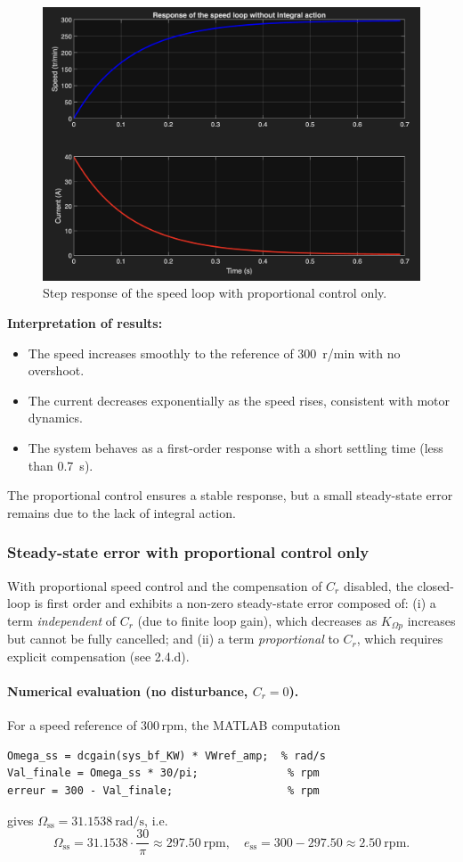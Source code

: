 \documentclass{rapportCS}
\begin{document}
\begin{figure}[H]
    \centering
    \includegraphics[width=0.85\linewidth]{figures/speedloop.png}
    \caption{Step response of the speed loop with proportional control only.}
    \label{fig:speedloop_no_integral}
\end{figure}

\noindent\textbf{Interpretation of results:}
\begin{itemize}
    \item The speed increases smoothly to the reference of 300~r/min with no overshoot.
    \item The current decreases exponentially as the speed rises, consistent with motor dynamics.
    \item The system behaves as a first-order response with a short settling time (less than 0.7~s).
\end{itemize}

The proportional control ensures a stable response, but a small steady-state error remains due to the lack of integral action.
\subsubsection{Steady-state error with proportional control only}

With proportional speed control and the compensation of $C_r$ disabled, the closed-loop is first order and exhibits a non-zero steady-state error composed of:
(i) a term \emph{independent} of $C_r$ (due to finite loop gain), which decreases as $K_{\Omega p}$ increases but cannot be fully cancelled; and
(ii) a term \emph{proportional} to $C_r$, which requires explicit compensation (see 2.4.d). \,

\paragraph{Numerical evaluation (no disturbance, $C_r=0$).}
For a speed reference of $300\,\mathrm{rpm}$, the MATLAB computation
\begin{verbatim}
Omega_ss = dcgain(sys_bf_KW) * VWref_amp;  % rad/s
Val_finale = Omega_ss * 30/pi;              % rpm
erreur = 300 - Val_finale;                  % rpm
\end{verbatim}
gives $\Omega_{\text{ss}}=31.1538~\mathrm{rad/s}$, i.e.
\[
\Omega_{\text{ss}} = 31.1538 \cdot \frac{30}{\pi} \approx 297.50~\mathrm{rpm},
\quad
e_{\text{ss}} = 300 - 297.50 \approx \boxed{2.50~\mathrm{rpm}}.
\]
\end{document}
